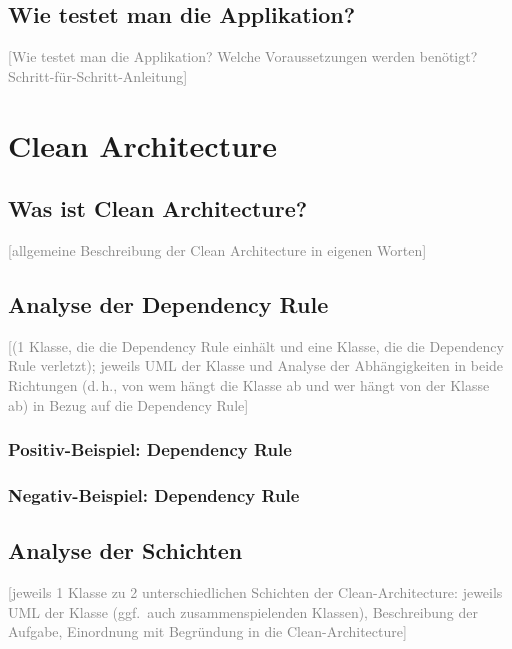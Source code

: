 \documentclass[a4paper,12pt]{article}
\newcommand{\placeholder}[1]{\textcolor{gray}{[#1]}}
\begin{document}
\subsection*{Wie testet man die Applikation?}

\placeholder{Wie testet man die Applikation? Welche Voraussetzungen werden benötigt? Schritt-für-Schritt-Anleitung}

\section{Clean Architecture}

\subsection*{Was ist Clean Architecture?}

\placeholder{allgemeine Beschreibung der Clean Architecture in eigenen Worten}

\subsection*{Analyse der Dependency Rule}

\placeholder{(1 Klasse, die die Dependency Rule einhält und eine Klasse, die die Dependency Rule verletzt);
    jeweils UML der Klasse und Analyse der Abhängigkeiten in beide Richtungen (d.\,h., von wem hängt die Klasse
    ab und wer hängt von der Klasse ab) in Bezug auf die Dependency Rule}

\subsubsection*{Positiv-Beispiel: Dependency Rule}

\subsubsection*{Negativ-Beispiel: Dependency Rule}

\subsection*{Analyse der Schichten}

\placeholder{jeweils 1 Klasse zu 2 unterschiedlichen Schichten der Clean-Architecture: jeweils UML der Klasse
    (ggf.\ auch zusammenspielenden Klassen), Beschreibung der Aufgabe, Einordnung mit Begründung in die Clean-Architecture}
\end{document}

